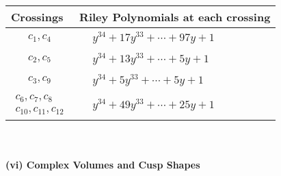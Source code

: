 \documentclass[1p]{elsarticle_modified}
\theoremstyle{definition}
\begin{document}
\begin{tabular}{m{50pt}|m{274pt}}
Crossings & \hspace{64pt}Riley Polynomials at each crossing \\
\hline $$\begin{aligned}c_{1},c_{4}\end{aligned}$$&$\begin{aligned}
&y^{34}+17 y^{33}+\cdots+97 y+1
\end{aligned}$\\
\hline $$\begin{aligned}c_{2},c_{5}\end{aligned}$$&$\begin{aligned}
&y^{34}+13 y^{33}+\cdots+5 y+1
\end{aligned}$\\
\hline $$\begin{aligned}c_{3},c_{9}\end{aligned}$$&$\begin{aligned}
&y^{34}+5 y^{33}+\cdots+5 y+1
\end{aligned}$\\
\hline $$\begin{aligned}c_{6},c_{7},c_{8}\\c_{10},c_{11},c_{12}\end{aligned}$$&$\begin{aligned}
&y^{34}+49 y^{33}+\cdots+25 y+1
\end{aligned}$\\
\hline
\end{tabular}\\~\\
\newpage\flushleft \textbf{(vi) Complex Volumes and Cusp Shapes}
\end{document}
